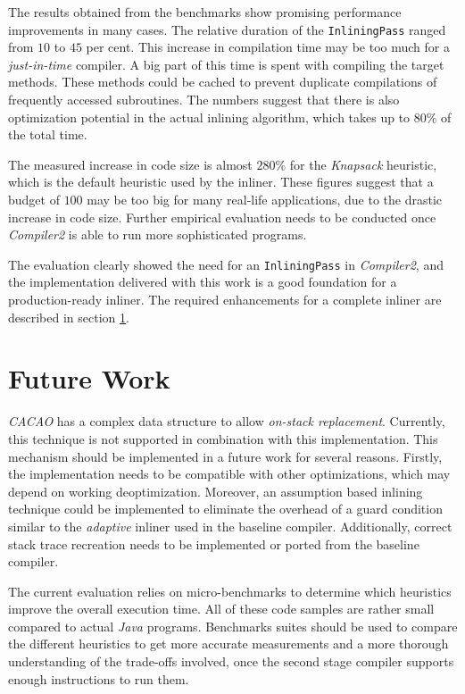 \documentclass[draft, final]{vutinfth} %
\begin{document}
The results obtained from the benchmarks show promising performance improvements in many cases. The relative duration of the \texttt{InliningPass} ranged from $10$ to $45$ per cent. This increase in compilation time may be too much for a \emph{just-in-time} compiler. A big part of this time is spent with compiling the target methods. These methods could be cached to prevent duplicate compilations of frequently accessed subroutines. The numbers suggest that there is also optimization potential in the actual inlining algorithm, which takes up to $80 \%$ of the total time.

The measured increase in code size is almost $280 \%$ for the \emph{Knapsack} heuristic, which is the default heuristic used by the inliner. These figures suggest that a budget of $100$ may be too big for many real-life applications, due to the drastic increase in code size. Further empirical evaluation needs to be conducted once \emph{Compiler2} is able to run more sophisticated programs.

The evaluation clearly showed the need for an \texttt{InliningPass} in \emph{Compiler2}, and the implementation delivered with this work is a good foundation for a production-ready inliner. The required enhancements for a complete inliner are described in section \ref{sec:future-work}.

\chapter{Future Work}
\label{sec:future-work}

\emph{CACAO} has a complex data structure to allow \emph{on-stack replacement}. Currently, this technique is not supported in combination with this implementation. This mechanism should be implemented in a future work for several reasons. Firstly, the implementation needs to be compatible with other optimizations, which may depend on working deoptimization. Moreover, an assumption based inlining technique could be implemented to eliminate the overhead of a guard condition similar to the \emph{adaptive} inliner used in the baseline compiler. Additionally, correct stack trace recreation needs to be implemented or ported from the baseline compiler.

The current evaluation relies on micro-benchmarks to determine which heuristics improve the overall execution time. All of these code samples are rather small compared to actual \emph{Java} programs. Benchmarks suites should be used to compare the different heuristics to get more accurate measurements and a more thorough understanding of the trade-offs involved, once the second stage compiler supports enough instructions to run them.
\end{document}
